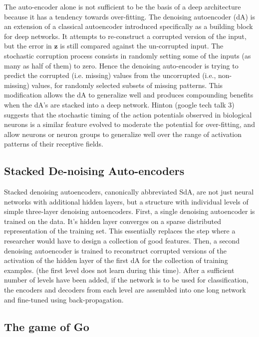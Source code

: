 \documentclass[12pt]{article}
\begin{document}
The auto-encoder alone is not sufficient to be the basis of a deep architecture because it has a tendency towards over-fitting. The denoising autoencoder (dA) is an extension of a classical autoencoder introduced specifically as a building block for deep networks\cite{Vincint08}.  It attempts to re-construct a corrupted version of the input, but the error in $\mathbf z$ is still compared against the un-corrupted input. The stochastic corruption process consists in randomly setting some of the inputs (as many as half of them) to zero. Hence the denoising auto-encoder is trying to predict the corrupted (i.e. missing) values from the uncorrupted (i.e., non-missing) values, for randomly selected subsets of missing patterns. This modification allows the dA to generalize well and produces compounding benefits when the dA's are stacked into a deep network\cite{Hinton06}. Hinton (google tech talk 3) suggests that the stochastic timing of the action potentials observed in biological neurons is a similar feature evolved to moderate the potential for over-fitting, and allow neurons or neuron groups to generalize well over the range of activation patterns of their receptive fields.

	\subsection{Stacked De-noising Auto-encoders}
	
Stacked denoising autoencoders, canonically abbreviated SdA, are not just neural networks with additional hidden layers, but a structure with individual levels of simple three-layer denoising autoencoders. First, a single denoising autoencoder is trained on the data. It's hidden layer converges on a sparse distributed representation of the training set. This essentially replaces the step where a researcher would have to design a collection of good features. Then, a second denoising autoencoder is trained to reconstruct corrupted versions of the activation of the hidden layer of the first dA for the collection of training examples. (the first level does not learn during this time). After a sufficient number of levels have been added, if the network is to be used for classification, the encoders and decoders from each level are assembled into one long network and fine-tuned using back-propagation.

	\subsection{The game of Go}
	
\end{document}
